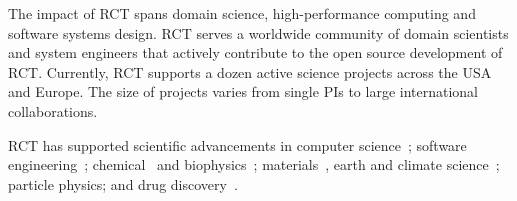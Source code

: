 \documentclass[preprint,12pt, a4paper]{elsarticle}
\begin{document}

The impact of RCT spans domain science, high-performance computing and software
systems design. RCT serves a worldwide community of domain scientists and system
engineers that actively contribute to the open source development of RCT\@.
Currently, RCT supports a dozen active science projects across the USA and
Europe. The size of projects varies from single PIs to large international
collaborations.



RCT has supported scientific advancements in computer
science~\cite{merzky2018synapse}; software
engineering~\cite{turilli2019middleware}; chemical~\cite{sampat2018parallel} and
biophysics~\cite{shkurti2016coco,dakka2018high}; materials~\cite{dakka2018high},
earth and climate
science~\cite{paraskevakos2019workflow,balasubramanian2018harnessing}; particle
physics\cite{oleynik2017high}; and drug discovery~\cite{bfe-jctc-2014}.

\end{document}
